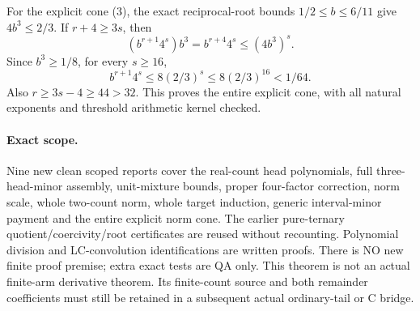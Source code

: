 For the explicit cone (3), the exact reciprocal-root bounds
$1/2\le b\le6/11$ give $4b^3\le2/3$. If $r+4\ge3s$, then
\[
 (b^{r+1}4^s)b^3=b^{r+4}4^s\le(4b^3)^s.
\]
Since $b^3\ge1/8$, for every $s\ge16$,
\[
 b^{r+1}4^s\le8(2/3)^s\le8(2/3)^{16}<1/64.
\]
Also $r\ge3s-4\ge44>32$. This proves the entire explicit cone,
with all natural exponents and threshold arithmetic kernel checked.

\paragraph{Exact scope.}
Nine new clean scoped reports cover the real-count head polynomials,
full three-head-minor assembly, unit-mixture bounds, proper four-factor
correction, norm scale, whole two-count norm, whole target induction,
generic interval-minor payment and the entire explicit norm cone.
The earlier pure-ternary quotient/coercivity/root certificates are
reused without recounting. Polynomial division and LC-convolution
identifications are written proofs. There is NO new finite proof
premise; extra exact tests are QA only. This theorem is not an actual
finite-arm derivative theorem. Its finite-count source and both
remainder coefficients must still be retained in a subsequent actual
ordinary-tail or C bridge.
